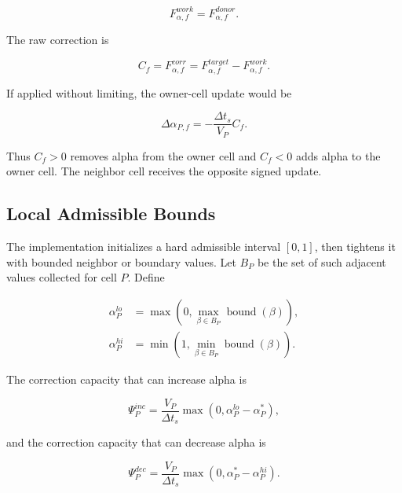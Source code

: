 \documentclass[11pt]{article}
\newcommand{\bnd}{\operatorname{bound}}
\begin{document}
\begin{equation}
  F_{\alpha,f}^{work}=F_{\alpha,f}^{donor}.
\end{equation}

The raw correction is

\begin{equation}
  C_f
  =
  F_{\alpha,f}^{corr}
  =
  F_{\alpha,f}^{target}
  -
  F_{\alpha,f}^{work}.
  \label{eq:raw-correction}
\end{equation}

If applied without limiting, the owner-cell update would be

\begin{equation}
  \Delta\alpha_{P,f}
  =
  -\frac{\Delta t_s}{V_P}C_f.
  \label{eq:owner-correction-update}
\end{equation}

Thus \(C_f>0\) removes alpha from the owner cell and \(C_f<0\) adds alpha to
the owner cell.  The neighbor cell receives the opposite signed update.

\subsection{Local Admissible Bounds}

The implementation initializes a hard admissible interval \([0,1]\), then
tightens it with bounded neighbor or boundary values.  Let \(B_P\) be the set
of such adjacent values collected for cell \(P\).  Define

\begin{align}
  \alpha_P^{lo}
  &=
  \max
  \left(
    0,\max_{\beta\in B_P}\bnd(\beta)
  \right),
  \\
  \alpha_P^{hi}
  &=
  \min
  \left(
    1,\min_{\beta\in B_P}\bnd(\beta)
  \right).
\end{align}

The correction capacity that can increase alpha is

\begin{equation}
  \Psi_P^{inc}
  =
  \frac{V_P}{\Delta t_s}
  \max(0,\alpha_P^{lo}-\alpha_P^*),
  \label{eq:psi-inc}
\end{equation}

and the correction capacity that can decrease alpha is

\begin{equation}
  \Psi_P^{dec}
  =
  \frac{V_P}{\Delta t_s}
  \max(0,\alpha_P^*-\alpha_P^{hi}).
  \label{eq:psi-dec}
\end{equation}
\end{document}

